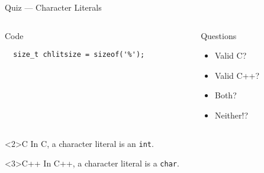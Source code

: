 \documentclass[presentation,aspectratio=169]{beamer}
\begin{document}
\begin{frame}[fragile,label={sec:org23c4234}]{Quiz — Character Literals}
\begin{columns}
\begin{column}{0.48\columnwidth}
\begin{block}{Code}
\begin{verbatim}
  size_t chlitsize = sizeof('%');
\end{verbatim}
\end{block}
\end{column}

\begin{column}{0.48\columnwidth}
\begin{block}{Questions}
\begin{itemize}
\item Valid C?
\item Valid C++?
\item Both?
\item Neither!?
\end{itemize}
\end{block}
\end{column}
\end{columns}

\begin{block}<2>{C}
In C, a character literal is an \texttt{int}.
\end{block}

\vspace{-1cm}
\begin{block}<3>{C++}
In C++, a character literal is a \texttt{char}.
\end{block}
\end{frame}

\end{document}
